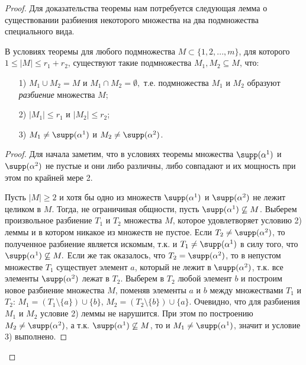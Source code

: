 \begin{proof}
	Для доказательства теоремы нам потребуется следующая лемма о существовании разбиения некоторого множества на два подмножества специального вида.

	\begin{lemma}[О разбиении]
		\label{Utv_Split}
		В условиях теоремы для любого подмножества $M \subset \{1,2,...,m\}$, для которого $1 \le |M|\le r_1+r_2$, существуют такие подмножества $M_1,M_2\subseteq M$, что:
		\begin{itemize}
			\item[1)] \(M_1\cup M_2 = M\) и \(M_1\cap M_2 = \emptyset,\) т.е.
			      подмножества \(M_1\) и \(M_2\) образуют \emph{разбиение} множества \(M\);
			\item[2)] $|M_1|\leqslant r_1$ и \(|M_2|\leqslant r_2\);
			\item[3)] $M_1 \neq \supp(\alpha^1)$ и \(M_2 \neq \supp(\alpha^2)\).
		\end{itemize}
	\end{lemma}

	\begin{proof}
		Для начала заметим, что в условиях теоремы множества \(\supp(\alpha^1)\) и \(\supp(\alpha^2)\) не пустые и они либо различны, либо совпадают и их мощность при этом по крайней мере 2.

		Пусть $|M| \geqslant 2$ и хотя бы одно из множеств \(\supp(\alpha^1)\) и \(\supp(\alpha^2)\) не лежит целиком в \(M\).
		Тогда, не ограничивая общности, пусть \(\supp(\alpha^1)\not\subseteq M\).
		Выберем произвольное разбиение \(T_1\) и \(T_2\) множества $M$, которое удовлетворяет условию 2) леммы и в котором никакое из множеств не пустое.
		Если $T_2 \neq \supp(\alpha^2)$, то полученное разбиение является искомым, т.к.
		и \(T_1\neq \supp(\alpha^1)\) в силу того, что \(\supp(\alpha^1)\not\subseteq M.\)
		Если же так оказалось, что $T_2 = \supp(\alpha^2)$, то в непустом множестве $T_1$ существует элемент \(a\), который не лежит в \(\supp(\alpha^2)\), т.к.
		все элементы \(\supp(\alpha^2)\) лежат в $T_2$.
		Выберем в \(T_2\) любой элемент \(b\) и построим новое разбиение множества $M$, поменяв элементы \(a\) и \(b\) между множествами \(T_1\) и \(T_2\): $M_1 = (T_1 \setminus \{a\}) \cup \{b\}$, $M_2 = (T_2 \setminus \{b\}) \cup \{a\}$.
		Очевидно, что для разбиения $M_1$ и $M_2$ условие 2) леммы не нарушится.
		При этом по построению $M_2 \neq \supp(\alpha^2)$, а т.к.
		$\supp(\alpha^1) \not\subseteq M$, то и $M_1 \neq \supp(\alpha^1)$, значит и условие 3) выполнено.


\end{proof}
\end{proof}
